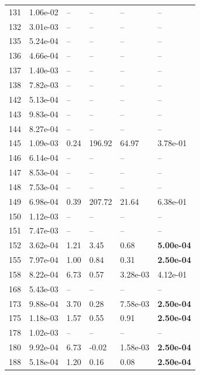 \begin{figure}[htbp!]
{\begin{minipage}[t]{0.48\linewidth}
\begin{tabular}{llllll}
                    131 & 1.06e-02 & -- & -- & -- & --\\
                    132 & 3.01e-03 & -- & -- & -- & --\\
                    135 & 5.24e-04 & -- & -- & -- & --\\
                    136 & 4.66e-04 & -- & -- & -- & --\\
                    137 & 1.40e-03 & -- & -- & -- & --\\
                    138 & 7.82e-03 & -- & -- & -- & --\\
                    142 & 5.13e-04 & -- & -- & -- & --\\
                    143 & 9.83e-04 & -- & -- & -- & --\\
                    144 & 8.27e-04 & -- & -- & -- & --\\
                    145 & 1.09e-03 & 0.24 & 196.92 & 64.97 & 3.78e-01\\
                    146 & 6.14e-04 & -- & -- & -- & --\\
                    147 & 8.53e-04 & -- & -- & -- & --\\
                    148 & 7.53e-04 & -- & -- & -- & --\\
                    149 & 6.98e-04 & 0.39 & 207.72 & 21.64 & 6.38e-01\\
                    150 & 1.12e-03 & -- & -- & -- & --\\
                    151 & 7.47e-03 & -- & -- & -- & --\\
                    152 & 3.62e-04 & 1.21 & 3.45 & 0.68 & \textbf{5.00e-04}\\
                    155 & 7.97e-04 & 1.00 & 0.84 & 0.31 & \textbf{2.50e-04}\\
                    158 & 8.22e-04 & 6.73 & 0.57 & 3.28e-03 & 4.12e-01\\
                    168 & 5.43e-03 & -- & -- & -- & --\\
                    173 & 9.88e-04 & 3.70 & 0.28 & 7.58e-03 & \textbf{2.50e-04}\\
                    175 & 1.18e-03 & 1.57 & 0.55 & 0.91 & \textbf{2.50e-04}\\
                    178 & 1.02e-03 & -- & -- & -- & --\\
                    180 & 9.92e-04 & 6.73 & -0.02 & 1.58e-03 & \textbf{2.50e-04}\\
                    188 & 5.18e-04 & 1.20 & 0.16 & 0.08 & \textbf{2.50e-04}\\

\end{tabular}
\end{minipage}}
\end{figure}
